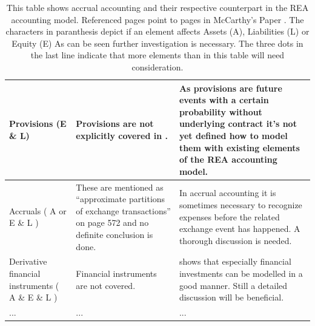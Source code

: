 \begin{table}
\begin{center}
\begin{tabular}{|p{}|p{}|p{}|}
	\hline
	Provisions (E \& L)  & Provisions are not explicitly covered in \cite{mccarthy1982rea}. & As provisions are future events with a certain probability without underlying contract it's not yet defined how to model them with existing elements of the REA accounting model. \\
	\hline
	Accruals ( A or E \& L ) & These are mentioned as “approximate partitions of exchange transactions” on  page 572 and no definite conclusion is done. & In accrual accounting it is sometimes necessary to recognize expenses before the related exchange event has happened. A thorough discussion is needed. \\ 
	\hline 
	Derivative financial instruments ( A \& E \& L )& Financial instruments are not covered. & 
	\cite{schwaiger2015aleandrea} shows that especially financial investments can be modelled in a good manner. Still a detailed discussion will be beneficial.
	\\
	\hline
	... & ... & ... \\
	\hline
\end{tabular} 
\end{center}
	\caption*{This table shows accrual accounting and their respective counterpart in the REA accounting model.
	Referenced pages point to pages in McCarthy's Paper \cite{mccarthy1982rea}.
     The characters in paranthesis depict if an element affects Assets (A), Liabilities (L) or Equity (E)
	 As can be seen further investigation is necessary. The three dots in the last line indicate that more elements than in this table will need consideration.}
\end{table}






